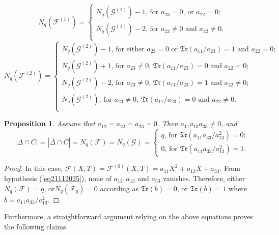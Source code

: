 \documentclass[sn-mathphys-num]{sn-jnl}%
\newtheorem{proposition}[theorem]{Proposition}
\begin{document}
\begin{equation}\label{eq20112025}
    N_q(\mathcal{F}^{(1)})=
\begin{cases}
 {\mbox{$N_q(\mathcal{G}^{(1)})-1$, for $a_{23}=0$, or $a_{22}=0$;}}\\
 {\mbox{$N_q(\mathcal{G}^{(1)})-2$, for $a_{23}\ne 0$ and $a_{22}\ne 0$
 .}}\\
\end{cases}
\end{equation}
\begin{equation}\label{eq20112025A}
    N_q(\mathcal{F}^{(2)})=
\begin{cases}
 {\mbox{$N_q(\mathcal{G}^{(2)})-1$, for either $a_{23}=0$ or $\mathfrak{Tr}(a_{11}/a_{23})=1$ and $a_{22}=0$;}}\\
 {\mbox{$N_q(\mathcal{G}^{(2)})+1$, for $a_{23}\ne 0$, $\mathfrak{Tr}(a_{11}/a_{23})=0$ and $a_{22}=0$;}}\\
 {\mbox{$N_q(\mathcal{G}^{(2)})-2$, for $a_{23}\ne 0$, $\mathfrak{Tr}(a_{11}/a_{23})=1$ and $a_{22}\ne 0$;}}\\
 {\mbox{$N_q(\mathcal{G}^{(2)})$, for $a_{23}\ne 0$, $\mathfrak{Tr}(a_{11}/a_{23})=0$ and $a_{22}\ne 0$.}}\\
\end{cases}
\end{equation}
\begin{proposition}
\label{pro02012026} Assume that $a_{12}=a_{22}=a_{23}=0$. Then $a_{11}a_{13}a_{33}\neq 0$, and 
$$|\Delta\cap C|=|\bar{\Delta}\cap C|=N_q(\mathcal{F})=N_q(\mathcal{G})=
\begin{cases}
{\mbox{$q$, for $\mathfrak{Tr}(a_{11}a_{33}/a_{13}^2)=0$}};\\
{\mbox{$0$, for $\mathfrak{Tr}(a_{11}a_{33}/a_{13}^2)=1$}}.
\end{cases}
$$
\end{proposition}
\begin{proof} In this case, $\mathcal{F}(X,T)=\mathcal{F}^{(0)}(X,T)=a_{11}X^2+a_{13}X+a_{33}$.  From hypothesis (\ref{eq21112025}),  none of $a_{11},a_{13}$ and $a_{33}$ vanishes. Therefore, 
either $N_q(\mathcal{F})=q$, or$N_q(\mathcal{F}_q)=0$ according as $\mathfrak{Tr}(b)=0$, or $\mathfrak{Tr}(b)=1$ where $b=a_{11}a_{33}/a_{13}^2$.  
\end{proof}
Furthermore, a straightforward argument relying on the above equations  proves the following claims.
\end{document}
